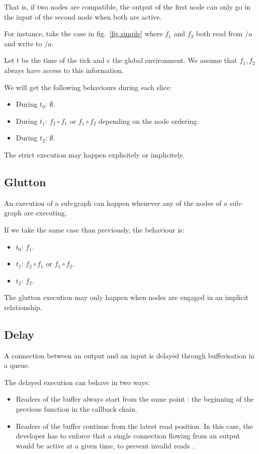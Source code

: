 \documentclass{article}
\begin{document}
That is, if two nodes are compatible, the output of the first node can only go in the input of the second node when both are active.
    
For instance, take the case in fig.~\ref{fig.simple} where $f_1$ and $f_2$ both read from $/a$ and write to $/a$.
    
Let $t$ be the time of the tick and $e$ the global environment. 
We assume that $f_1, f_2$ always have access to this information.
    
We will get the following behaviours during each slice: 
\begin{itemize}
  \item During $t_0$: $\emptyset$.
  \item During $t_1$: $f_2 \circ f_1 $ or $f_1 \circ f_2$ depending on the node ordering.
  \item During $t_2$: $\emptyset$. 
\end{itemize}

The strict execution may happen explicitely or implicitely.
    
\subsection{Glutton}
An execution of a sub-graph can happen whenever any of the nodes of a sub-graph are executing. 
    
If we take the same case than previously, the behaviour is:
\begin{itemize}
  \item $t_0$: $f_1$.
  \item $t_1$: $f_2 \circ f_1$ or $f_1 \circ f_2$.
  \item $t_2$: $f_2$. 
\end{itemize}

The glutton execution may only happen when nodes are engaged in an implicit relationship.
    
\subsection{Delay}
A connection between an output and an input is delayed through bufferisation in a queue.
	
The delayed execution can behave in two ways:
\begin{itemize}
  \item Readers of the buffer always start from the same point : the beginning of the previous function in the callback chain.
  \item Readers of the buffer continue from the latest read position.
        In this case, the developer has to enforce that a single connection flowing from an output would be active at a given time, to prevent invalid reads .%
\end{itemize}
	
\end{document}
